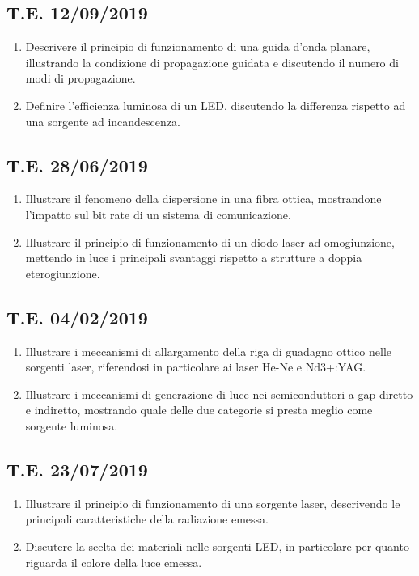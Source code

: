 \documentclass[9pt]{extarticle}
\begin{document}
\subsection{T.E. 12/09/2019}
\begin{enumerate}
  \item Descrivere il principio di funzionamento di una guida d’onda planare, illustrando la condizione di propagazione
        guidata e discutendo il numero di modi di propagazione.
  \item Definire l'efficienza luminosa di un LED, discutendo la differenza rispetto ad una sorgente ad incandescenza.
\end{enumerate}

\subsection{T.E. 28/06/2019}
\begin{enumerate}
  \item Illustrare il fenomeno della dispersione in una fibra ottica, mostrandone l’impatto sul bit rate di un sistema di
        comunicazione.
  \item Illustrare il principio di funzionamento di un diodo laser ad omogiunzione, mettendo in luce i principali svantaggi
        rispetto a strutture a doppia eterogiunzione.
\end{enumerate}

\subsection{T.E. 04/02/2019}
\begin{enumerate}
  \item Illustrare i meccanismi di allargamento della riga di guadagno ottico nelle sorgenti laser, riferendosi in particolare
        ai laser He-Ne e Nd3+:YAG.
  \item Illustrare i meccanismi di generazione di luce nei semiconduttori a gap diretto e indiretto, mostrando quale delle
        due categorie si presta meglio come sorgente luminosa.
\end{enumerate}

\subsection{T.E. 23/07/2019}
\begin{enumerate}
  \item Illustrare il principio di funzionamento di una sorgente laser, descrivendo le principali caratteristiche della
        radiazione emessa.
  \item Discutere la scelta dei materiali nelle sorgenti LED, in particolare per quanto riguarda il colore della luce emessa.
\end{enumerate}
\end{document}
